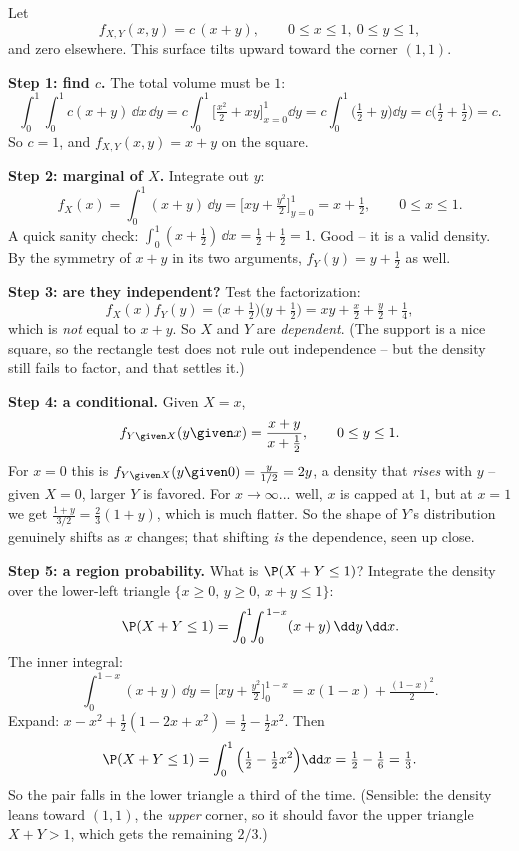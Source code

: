 \begin{example}
\label{ch13:ex-coupled}
Let
\[
  f_{X,Y}(x,y) = c\,(x + y), \qquad 0\le x\le 1,\ 0\le y\le 1,
\]
and zero elsewhere. This surface tilts upward toward the corner $(1,1)$.

\textbf{Step 1: find $c$.} The total volume must be $1$:
\[
  \int_0^1\!\!\int_0^1 c(x+y)\,\dd x\,\dd y
  = c\int_0^1\!\Big[\tfrac{x^2}{2} + xy\Big]_{x=0}^{1}\dd y
  = c\int_0^1\!\Big(\tfrac12 + y\Big)\dd y
  = c\Big(\tfrac12+\tfrac12\Big) = c.
\]
So $c = 1$, and $f_{X,Y}(x,y) = x+y$ on the square.

\textbf{Step 2: marginal of $X$.} Integrate out $y$:
\[
  f_X(x) = \int_0^1 (x+y)\,\dd y
         = \Big[xy + \tfrac{y^2}{2}\Big]_{y=0}^{1}
         = x + \tfrac12, \qquad 0\le x\le 1.
\]
A quick sanity check: $\int_0^1 (x+\tfrac12)\,\dd x = \tfrac12+\tfrac12 = 1$.
Good -- it is a valid density. By the symmetry of $x+y$ in its two arguments,
$f_Y(y) = y + \tfrac12$ as well.

\textbf{Step 3: are they independent?} Test the factorization:
\[
  f_X(x)f_Y(y) = \big(x+\tfrac12\big)\big(y+\tfrac12\big)
  = xy + \tfrac{x}{2} + \tfrac{y}{2} + \tfrac14,
\]
which is \emph{not} equal to $x+y$. So $X$ and $Y$ are \emph{dependent}. (The
support is a nice square, so the rectangle test does not rule out independence --
but the density still fails to factor, and that settles it.)

\textbf{Step 4: a conditional.} Given $X = x$,
\[
  f_{Y\given X}(y\given x) = \frac{x+y}{x+\tfrac12}, \qquad 0\le y\le 1.
\]
For $x = 0$ this is $f_{Y\given X}(y\given 0) = \frac{y}{1/2} = 2y$, a density
that \emph{rises} with $y$ -- given $X=0$, larger $Y$ is favored. For
$x\to\infty$... well, $x$ is capped at $1$, but at $x=1$ we get
$\frac{1+y}{3/2} = \tfrac23(1+y)$, which is much flatter. So the shape of $Y$'s
distribution genuinely shifts as $x$ changes; that shifting \emph{is} the
dependence, seen up close.

\textbf{Step 5: a region probability.} What is $\P(X+Y \le 1)$? Integrate the
density over the lower-left triangle $\{x\ge0,\,y\ge0,\,x+y\le1\}$:
\[
  \P(X+Y\le 1) = \int_0^1\!\!\int_0^{\,1-x}(x+y)\,\dd y\,\dd x.
\]
The inner integral:
\[
  \int_0^{1-x}(x+y)\,\dd y
  = \Big[xy + \tfrac{y^2}{2}\Big]_0^{1-x}
  = x(1-x) + \tfrac{(1-x)^2}{2}.
\]
Expand: $x - x^2 + \tfrac12(1 - 2x + x^2) = \tfrac12 - \tfrac12 x^2$. Then
\[
  \P(X+Y\le1) = \int_0^1\Big(\tfrac12 - \tfrac12 x^2\Big)\dd x
  = \tfrac12 - \tfrac16 = \tfrac13.
\]
So the pair falls in the lower triangle a third of the time. (Sensible: the
density leans toward $(1,1)$, the \emph{upper} corner, so it should favor the
upper triangle $X+Y>1$, which gets the remaining $2/3$.)
\end{example}


